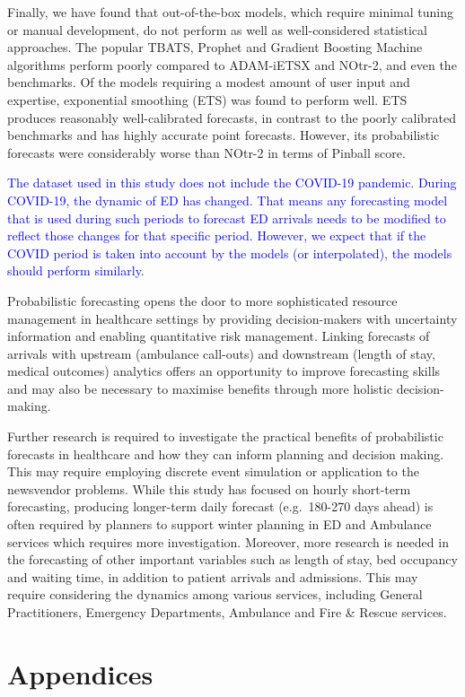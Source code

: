 \documentclass[]{elsarticle} %
\begin{document}
Finally, we have found that out-of-the-box models, which require minimal
tuning or manual development, do not perform as well as well-considered
statistical approaches. The popular TBATS, Prophet and Gradient Boosting
Machine algorithms perform poorly compared to ADAM-iETSX and NOtr-2, and
even the benchmarks. Of the models requiring a modest amount of user
input and expertise, exponential smoothing (ETS) was found to perform
well. ETS produces reasonably well-calibrated forecasts, in contrast to
the poorly calibrated benchmarks and has highly accurate point
forecasts. However, its probabilistic forecasts were considerably worse
than NOtr-2 in terms of Pinball score.

\textcolor{blue}{
The dataset used in this study does not include the COVID-19 pandemic. During COVID-19, the dynamic of ED has changed. That means any forecasting model that is used during such periods to forecast ED arrivals needs to be modified to reflect those changes for that specific period. However, we expect that if the COVID period is taken into account by the models (or interpolated), the models should perform similarly.}

Probabilistic forecasting opens the door to more sophisticated resource
management in healthcare settings by providing decision-makers with
uncertainty information and enabling quantitative risk management.
Linking forecasts of arrivals with upstream (ambulance call-outs) and
downstream (length of stay, medical outcomes) analytics offers an
opportunity to improve forecasting skills and may also be necessary to
maximise benefits through more holistic decision-making.

Further research is required to investigate the practical benefits of
probabilistic forecasts in healthcare and how they can inform planning
and decision making. This may require employing discrete event simulation or
application to the newsvendor problems. While this study has focused on
hourly short-term forecasting, producing longer-term daily forecast
(e.g.~180-270 days ahead) is often required by planners to support
winter planning in ED and Ambulance services which requires more
investigation. Moreover, more research is needed in the forecasting of
other important variables such as length of stay, bed occupancy and
waiting time, in addition to patient arrivals and admissions. This may
require considering the dynamics among various services, including
General Practitioners, Emergency Departments, Ambulance and Fire \&
Rescue services.

\hypertarget{appendices}{%
\section{Appendices}\label{appendices}}
\end{document}
